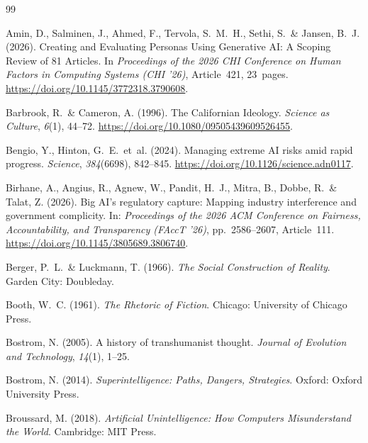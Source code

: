 \documentclass[12pt,a4paper]{article}
\begin{document}
\newpage

\begin{thebibliography}{99}

  Amin, D., Salminen, J., Ahmed, F., Tervola, S.~M.~H., Sethi, S.~\& Jansen, B.~J. (2026).
  Creating and Evaluating Personas Using Generative AI: A Scoping Review of 81 Articles.
  In \textit{Proceedings of the 2026 CHI Conference on Human Factors in Computing Systems (CHI '26)}, Article~421, 23~pages.
  \url{https://doi.org/10.1145/3772318.3790608}.

  Barbrook, R.~\& Cameron, A. (1996).
  The Californian Ideology.
  \textit{Science as Culture}, \textit{6}(1), 44--72.
  \url{https://doi.org/10.1080/09505439609526455}.

  Bengio, Y., Hinton, G.~E.~et~al. (2024).
  Managing extreme AI risks amid rapid progress.
  \textit{Science}, \textit{384}(6698), 842--845.
  \url{https://doi.org/10.1126/science.adn0117}.

  Birhane, A., Angius, R., Agnew, W., Pandit, H.~J., Mitra, B., Dobbe, R.~\& Talat, Z. (2026).
  Big AI's regulatory capture: Mapping industry interference and government complicity.
  In: \textit{Proceedings of the 2026 ACM Conference on Fairness, Accountability, and Transparency (FAccT '26)}, pp.~2586--2607, Article~111.
  \url{https://doi.org/10.1145/3805689.3806740}.

  Berger, P.~L.~\& Luckmann, T. (1966).
  \textit{The Social Construction of Reality}.
  Garden City: Doubleday.

  Booth, W.~C. (1961).
  \textit{The Rhetoric of Fiction}.
  Chicago: University of Chicago Press.

  Bostrom, N. (2005).
  A history of transhumanist thought.
  \textit{Journal of Evolution and Technology}, \textit{14}(1), 1--25.

  Bostrom, N. (2014).
  \textit{Superintelligence: Paths, Dangers, Strategies}.
  Oxford: Oxford University Press.

  Broussard, M. (2018).
  \textit{Artificial Unintelligence: How Computers Misunderstand the World}.
  Cambridge: MIT Press.


\end{thebibliography}
\end{document}
